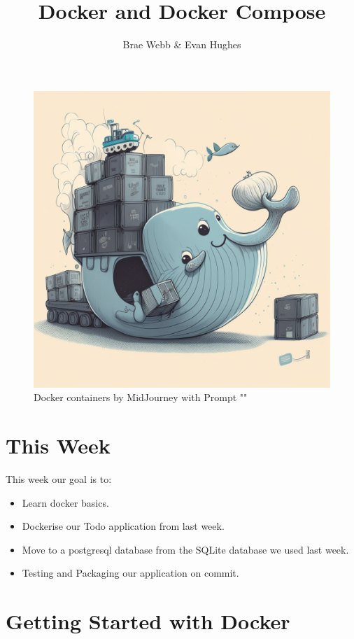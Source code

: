 \documentclass{csse4400}
\title{Docker and Docker Compose}
\author{Brae Webb \& Evan Hughes}
\date{\week{3}}
\begin{document}
\maketitle

\begin{figure}[h]
  \begin{center}
    \includegraphics[scale=0.4]{images/docker}
  \end{center}
  \caption{Docker containers by MidJourney with Prompt ""}
\end{figure}

\section{This Week}
This week our goal is to:
\begin{itemize}
  \item Learn docker basics.
  \item Dockerise our Todo application from last week.
  \item Move to a postgresql database from the SQLite database we used last week.
  \item Testing and Packaging our application on commit.
\end{itemize}

\pagebreak
\section{Getting Started with Docker}
\end{document}
